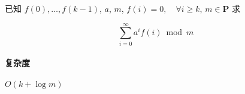 已知 \(f(0),\dots,f(k-1)\), \(a\), \(m\), \(f(i)=0,\quad \forall i\geq k\), \(m\in\mathbf{P}\) 求

\[
    \sum_{i=0}^{\infty} a^i f(i)\bmod{m}
\]

\paragraph{复杂度}

\(O(k+\log m)\)